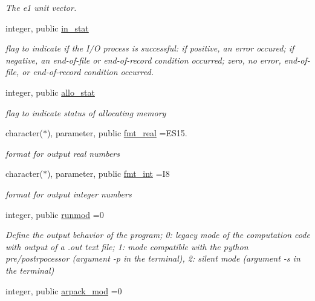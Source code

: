 \begin{DoxyCompactItemize}
\begin{DoxyCompactList}\small\item\em The e1 unit vector. \end{DoxyCompactList}\item 
integer, public \hyperlink{namespaceglobaldatafun_a64c0718f56f06c9fe3cfb49b0dc5ced0}{in\+\_\+stat}
\begin{DoxyCompactList}\small\item\em flag to indicate if the I/O process is successful\+: if positive, an error occured; if negative, an end-\/of-\/file or end-\/of-\/record condition occurred; zero, no error, end-\/of-\/file, or end-\/of-\/record condition occurred. \end{DoxyCompactList}\item 
integer, public \hyperlink{namespaceglobaldatafun_ac0c29e0202eb23daead1a4fcecc645ea}{allo\+\_\+stat}
\begin{DoxyCompactList}\small\item\em flag to indicate status of allocating memory \end{DoxyCompactList}\item 
character($\ast$), parameter, public \hyperlink{namespaceglobaldatafun_ab9b7950cc6b98bba6c90ccbc0bf16763}{fmt\+\_\+real} =\textquotesingle{}E\+S15.\textquotesingle{}
\begin{DoxyCompactList}\small\item\em format for output real numbers \end{DoxyCompactList}\item 
character($\ast$), parameter, public \hyperlink{namespaceglobaldatafun_a9636e338fbbaf3b710c9483f5ba825ad}{fmt\+\_\+int} =\textquotesingle{}I8\textquotesingle{}
\begin{DoxyCompactList}\small\item\em format for output integer numbers \end{DoxyCompactList}\item 
integer, public \hyperlink{namespaceglobaldatafun_a69fb7d8f3bbcc95ea17d1f924b50fbfa}{runmod} =0
\begin{DoxyCompactList}\small\item\em Define the output behavior of the program; 0\+: legacy mode of the computation code with output of a .out text file; 1\+: mode compatible with the python pre/postrpocessor (argument -\/p in the terminal), 2\+: silent mode (argument -\/s in the terminal) \end{DoxyCompactList}\item 
integer, public \hyperlink{namespaceglobaldatafun_ac1ee1084ba0c21ae53df281847753757}{arpack\+\_\+mod} =0

\end{DoxyCompactItemize}
